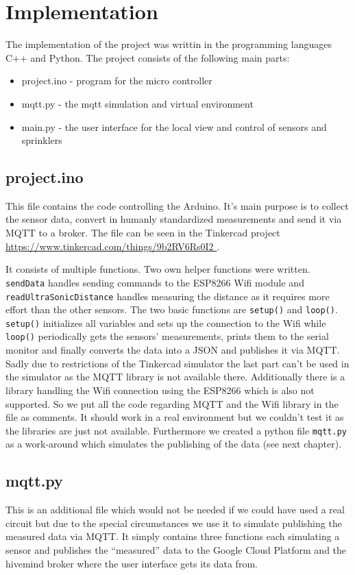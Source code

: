 \documentclass{article}
\begin{document}
\section{Implementation}
The implementation of the project was writtin in the programming languages C++ and Python. The project consists of the following main parts:
\begin{itemize}
    \item project.ino - program for the micro controller
	\item mqtt.py - the mqtt simulation and virtual environment 
	\item main.py - the user interface for the local view and control of sensors and sprinklers
\end{itemize}
\subsection{project.ino}
This file contains the code controlling the Arduino. It's main purpose is to collect the sensor data, convert in humanly standardized measurements and send it via MQTT to a broker. The file can be seen in the Tinkercad project \url{ https://www.tinkercad.com/things/9b2RV6Rs0I2 }.\par 
It consists of multiple functions. Two own helper functions were written. \texttt{sendData} handles sending commands to the ESP8266 Wifi module and \texttt{readUltraSonicDistance} handles measuring the distance as it requires more effort than the other sensors. The two basic functions are \texttt{setup()} and \texttt{loop()}. \texttt{setup()} initializes all variables and sets up the connection to the Wifi while \texttt{loop()} periodically gets the sensors' measurements, prints them to the serial monitor and finally converts the data into a JSON and publishes it via MQTT. Sadly due to restrictions of the Tinkercad simulator the last part can't be used in the simulator as the MQTT library is not available there. Additionally there is a library handling the Wifi connection using the ESP8266 which is also not supported. So we put all the code regarding MQTT and the Wifi library in the file as comments. It should work in a real environment but we couldn't test it as the libraries are just not available. Furthermore we created a python file \texttt{mqtt.py} as a work-around which simulates the publishing of the data (see next chapter).\par
\subsection{mqtt.py}
This is an additional file which would not be needed if we could have used a real circuit but due to the special circumstances we use it to simulate publishing the measured data via MQTT. It simply contains three functions each simulating a sensor and publishes the \enquote{measured} data to the Google Cloud Platform and the hivemind broker where the user interface gets its data from.
\end{document}
